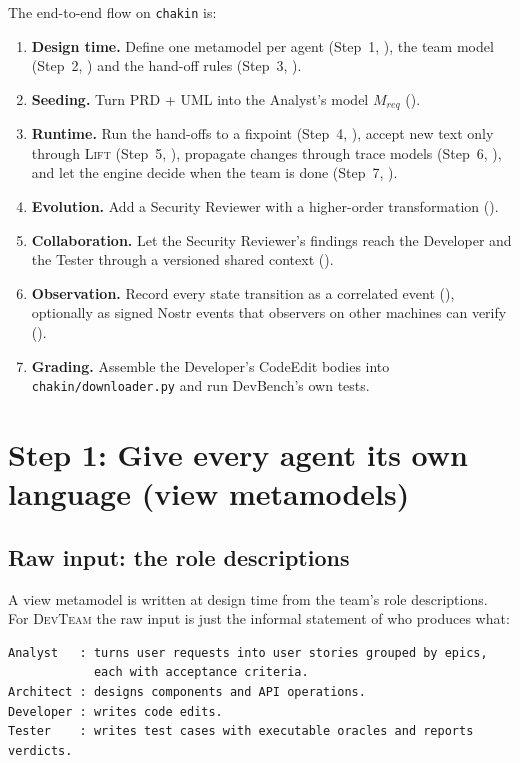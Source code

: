 \documentclass[10pt,a4paper]{article}
\newcommand{\devteam}{\textsc{DevTeam}}
\newcommand{\cls}[1]{\textsf{#1}}
\newcommand{\file}[1]{\texttt{#1}}
\theoremstyle{definition}
\begin{document}
The end-to-end flow on \texttt{chakin} is:
\begin{enumerate}[nosep]
\item \textbf{Design time.} Define one metamodel per agent (Step~1,
), the team model (Step~2, ) and the hand-off
rules (Step~3, ).
\item \textbf{Seeding.} Turn PRD + UML into the Analyst's model
$M_{\mathit{req}}$ ().
\item \textbf{Runtime.} Run the hand-offs to a fixpoint (Step~4,
), accept new text only through \textsc{Lift} (Step~5,
), propagate changes through trace models (Step~6,
), and let the engine decide when the team is done
(Step~7, ).
\item \textbf{Evolution.} Add a Security Reviewer with a higher-order
transformation ().
\item \textbf{Collaboration.} Let the Security Reviewer's findings reach the
Developer and the Tester through a versioned shared context
().
\item \textbf{Observation.} Record every state transition as a correlated
event (), optionally as signed Nostr events that observers on
other machines can verify ().
\item \textbf{Grading.} Assemble the Developer's \cls{CodeEdit} bodies into
\file{chakin/downloader.py} and run DevBench's own tests.
\end{enumerate}

\section{Step 1: Give every agent its own language (view metamodels)}\label{sec:step1}

\subsection{Raw input: the role descriptions}

A view metamodel is written at design time from the team's role
descriptions. For \devteam{} the raw input is just the informal statement of
who produces what:

\begin{lstlisting}[style=raw, caption={Raw input 4: role descriptions (from the paper, Section~II-B).}, label={lst:roles}]
Analyst   : turns user requests into user stories grouped by epics,
            each with acceptance criteria.
Architect : designs components and API operations.
Developer : writes code edits.
Tester    : writes test cases with executable oracles and reports verdicts.
\end{lstlisting}
\end{document}
